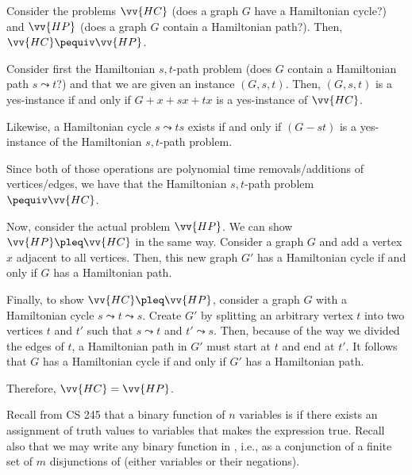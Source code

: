 \begin{prop}\label{prop:c:hchp}
  Consider the problems $\vv{HC}$ (does a graph $G$ have a Hamiltonian cycle?)\@
  and $\vv{HP}$ (does a graph $G$ contain a Hamiltonian path?).
  Then, $\vv{HC} \pequiv \vv{HP}$.
\end{prop}
\begin{prf}
  Consider first the Hamiltonian $s,t$-path problem
  (does $G$ contain a Hamiltonian path $s \leadsto t$?)
  and that we are given an instance $(G, s, t)$.
  Then, $(G, s, t)$ is a yes-instance if and only if
  $G+x+sx+tx$ is a yes-instance of $\vv{HC}$.

  Likewise, a Hamiltonian cycle $s \leadsto ts$
  exists if and only if $(G - st)$ is a yes-instance
  of the Hamiltonian $s,t$-path problem.

  Since both of those operations are polynomial time
  removals/additions of vertices/edges,
  we have that the Hamiltonian $s,t$-path problem $\pequiv \vv{HC}$.

  Now, consider the actual problem $\vv{HP}$.
  We can show $\vv{HP} \pleq \vv{HC}$ in the same way.
  Consider a graph $G$ and add a vertex $x$ adjacent to all vertices.
  Then, this new graph $G'$ has a Hamiltonian cycle
  if and only if $G$ has a Hamiltonian path.

  Finally, to show $\vv{HC} \pleq \vv{HP}$,
  consider a graph $G$ with a Hamiltonian cycle
  $s \leadsto t \leadsto s$.
  Create $G'$ by splitting an arbitrary vertex $t$
  into two vertices $t$ and $t'$ such that $s \leadsto t$ and $t' \leadsto s$.
  Then, because of the way we divided the edges of $t$,
  a Hamiltonian path in $G'$ must start at $t$ and end at $t'$.
  It follows that $G$ has a Hamiltonian cycle if and only if
  $G'$ has a Hamiltonian path.

  Therefore, $\vv{HC} = \vv{HP}$.
\end{prf}

Recall from CS 245 that a binary function of $n$ variables is 
if there exists an assignment of truth values to variables that makes the expression true.
Recall also that we may write any binary function
in , i.e., as a conjunction
of a finite set of $m$ disjunctions of  (either variables or their negations).

